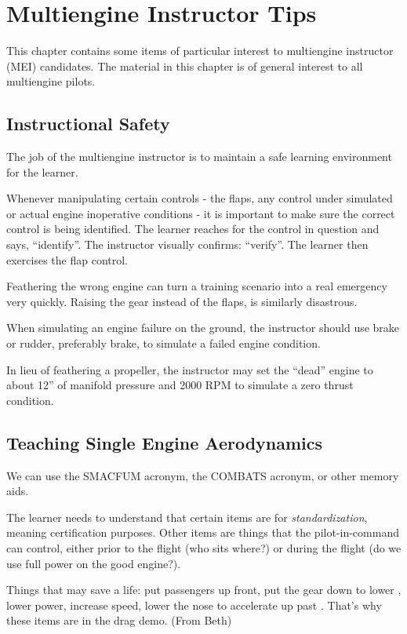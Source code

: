 
\chapter{Multiengine Instructor Tips}

This chapter contains some items of particular interest to multiengine instructor (MEI) candidates.
The material in this chapter is of general interest to all multiengine pilots.

\section{Instructional Safety}

The job of the multiengine instructor is to maintain a safe learning environment for the learner.

Whenever manipulating certain controls - the flaps, any control under simulated or actual engine inoperative conditions -
it is important to make sure the correct control is being identified. The learner reaches for the control in question and
says, ``identify''. The instructor visually confirms: ``verify''. The learner then exercises the flap control.

Feathering the wrong engine can turn a training scenario into a real emergency very quickly. Raising the gear
instead of the flaps, is similarly disastrous.

When simulating an engine failure on the ground, the instructor should use brake or rudder, preferably brake,
to simulate a failed engine condition.

In lieu of feathering a propeller, the instructor may set the ``dead'' engine to about 12'' of manifold pressure
and 2000 RPM to simulate a zero thrust condition.

\section{Teaching Single Engine Aerodynamics}

We can use the SMACFUM acronym, the COMBATS acronym, or other memory aids.

The learner needs to understand that certain items are for \emph{standardization}, meaning
certification purposes. Other items are things that the pilot-in-command can control, either prior
to the flight (who sits where?) or during the flight (do we use full power on the good engine?).

Things that may save a life: put passengers up front, put the gear down to lower \vmc, lower power, increase speed, lower the nose to accelerate up past \vmc. That's why these items are in the drag demo. (From Beth)

